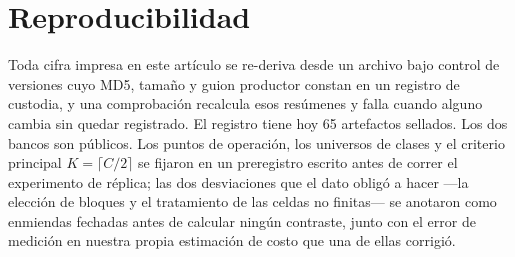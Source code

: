 \section{Reproducibilidad}
\label{sec:apendice}

Toda cifra impresa en este artículo se re-deriva desde un archivo bajo control de versiones cuyo
MD5, tamaño y guion productor constan en un registro de custodia, y una comprobación recalcula esos
resúmenes y falla cuando alguno cambia sin quedar registrado. El registro tiene hoy \num{65}
artefactos sellados. Los dos bancos son públicos. Los puntos de operación, los universos de clases
y el criterio principal $K = \lceil C/2 \rceil$ se fijaron en un preregistro escrito antes de
correr el experimento de réplica; las dos desviaciones que el dato obligó a hacer —la elección de
bloques y el tratamiento de las celdas no finitas— se anotaron como enmiendas fechadas antes de
calcular ningún contraste, junto con el error de medición en nuestra propia estimación de costo que
una de ellas corrigió.
